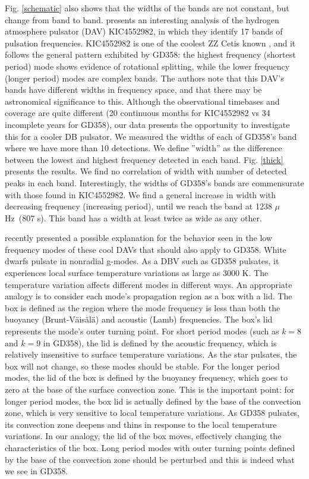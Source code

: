 \documentclass[12pt,preprint]{aastex}
\newcommand{\muHz}{\mbox{$\mu$Hz}}
\begin{document}
Fig. \ref{schematic} also shows that the widths of the bands are not constant, but change 
from band to band. \citet{Bell15} presents an interesting analysis of the hydrogen atmosphere pulsator 
(DAV) KIC4552982, in which they identify 17 bands of pulsation frequencies. KIC4552982 is one of the 
coolest ZZ Cetis known \citep{Tremblay2013}, and it follows the general pattern exhibited 
by GD358: the highest frequency (shortest period) mode shows evidence of rotational splitting, while the 
lower frequency (longer period) modes are complex bands. The authors note that this DAV's bands have 
different widths in frequency space, and that there may be astronomical significance to this. 
Although the observational timebases and coverage are quite different (20 continuous months 
for KIC4552982 vs 34 incomplete years for GD358), our data presents the opportunity to investigate this 
for a cooler DB pulsator.  We measured the widths of each of GD358's band where we have
more than 10 detections. We define ''width'' as the difference between the lowest and highest frequency 
detected in each band. Fig. \ref{thick} presents the results. We find no correlation of width with number
of detected peaks in each band. Interestingly, the widths of GD358's bands are commensurate with those 
found in KIC4552982. We find a general increase in width with decreasing frequency (increasing period), 
until we reach the band at 1238 \muHz\ (807 s). This band has a width at least twice as wide as any other. 

\citet{Mont2016} recently presented a possible explanation for the behavior seen in the low frequency modes
of these cool DAVs that should also apply to GD358. White dwarfs pulsate in nonradial g-modes. As a DBV such as 
GD358 pulsates, it experiences local surface temperature variations as large as 3000 K.  The temperature 
variation affects different modes in different ways.  An appropriate analogy is to consider each mode's 
propagation region as a box with a lid. The box is defined as the region where the mode frequency is 
less than both the buoyancy (Brunt-V{\"a}is{\"a}l{\"a}) and acoustic (Lamb) frequencies.  The box's lid 
represents the mode's outer turning point. For short period modes (such as $k=8$ and $k=9$ in GD358), the 
lid is defined by the acoustic frequency, which is relatively insensitive to surface temperature variations. 
As the star pulsates, the box will not change, so these modes should be stable.  For the longer period modes, 
the lid of the box is defined by the buoyancy frequency, which goes to zero at the base of the surface 
convection zone. This is the important point: for longer period modes, the box lid
is actually defined by the base of the convection zone, which is very sensitive to local temperature variations.  
As GD358 pulsates, its convection zone deepens and thins in response to the local temperature variations. 
In our analogy, the lid of the box moves, effectively changing the characteristics of the box. Long period modes with 
outer turning points defined by the base of the convection zone should be perturbed and this is indeed 
what we see in GD358. 
\end{document}
